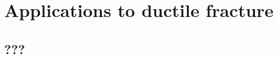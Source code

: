 \section{Applications to ductile fracture}

\sectioncover

\subsection{???}

\begin{frame}
\end{frame}
